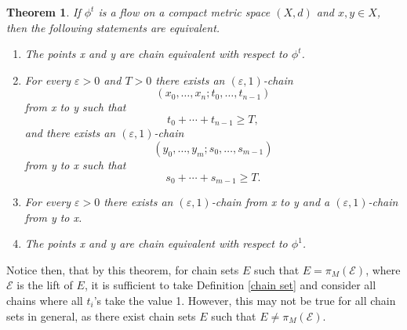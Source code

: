 \documentclass[11pt]{article}
\newtheorem{thm}{Theorem}
\begin{document}
\begin{thm}\label{h flow}
If $\phi^t$ is a flow on a compact metric space $(X,d)$ and $x,y\in X$, then the following statements are equivalent.
\begin{enumerate}
\item The points x and y are chain equivalent with respect to $\phi^t$.
\item For every $\varepsilon>0$ and $T>0$ there exists an $(\varepsilon,1)$-chain
$$(x_0,\ldots,x_n;t_0,\ldots,t_{n-1})$$
from x to y such that 
$$t_0+\cdots+t_{n-1}\geq T,$$
and there exists an $(\varepsilon,1)$-chain 
$$(y_0,\ldots,y_m;s_0,\ldots,s_{m-1})$$
from y to x such that
$$s_0+\cdots+s_{m-1}\geq T.$$
\item For every $\varepsilon>0$ there exists an $(\varepsilon,1)$-chain from x to y and a $(\varepsilon,1)$-chain from y to x.
\item The points x and y are chain equivalent with respect to $\phi^1$.
\end{enumerate}
\end{thm}

Notice then, that by this theorem, for chain sets $E$ such that $E=\pi_M(\mathcal{E})$, where $\mathcal{E}$ is the lift of $E$, it is sufficient to take Definition \ref{chain set} and consider all chains where all $t_i$'s take the value 1.  However, this may not be true for all chain sets in general, as there exist chain sets $E$ such that $E\not=\pi_M(\mathcal{E})$.  
\end{document}
